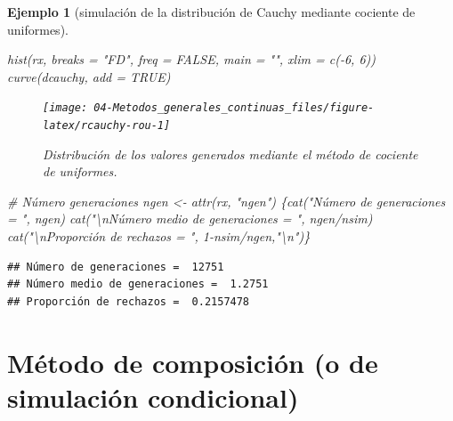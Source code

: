 \documentclass[
]{book}
\newenvironment{Shaded}{\begin{snugshade}}{\end{snugshade}}
\newcommand{\AttributeTok}[1]{\textcolor[rgb]{0.77,0.63,0.00}{#1}}
\newcommand{\CommentTok}[1]{\textcolor[rgb]{0.56,0.35,0.01}{\textit{#1}}}
\newcommand{\ConstantTok}[1]{\textcolor[rgb]{0.00,0.00,0.00}{#1}}
\newcommand{\DecValTok}[1]{\textcolor[rgb]{0.00,0.00,0.81}{#1}}
\newcommand{\FunctionTok}[1]{\textcolor[rgb]{0.00,0.00,0.00}{#1}}
\newcommand{\NormalTok}[1]{#1}
\newcommand{\OtherTok}[1]{\textcolor[rgb]{0.56,0.35,0.01}{#1}}
\newcommand{\SpecialCharTok}[1]{\textcolor[rgb]{0.00,0.00,0.00}{#1}}
\newcommand{\StringTok}[1]{\textcolor[rgb]{0.31,0.60,0.02}{#1}}
\theoremstyle{break}
\newtheorem{example}{Ejemplo}[chapter]
\theoremstyle{nonumberplain}
\begin{document}
\begin{example}[simulación de la distribución de Cauchy mediante cociente de uniformes]
\begin{Shaded}
\begin{Highlighting}[]
\FunctionTok{hist}\NormalTok{(rx, }\AttributeTok{breaks =} \StringTok{"FD"}\NormalTok{, }\AttributeTok{freq =} \ConstantTok{FALSE}\NormalTok{, }\AttributeTok{main =} \StringTok{""}\NormalTok{, }\AttributeTok{xlim =} \FunctionTok{c}\NormalTok{(}\SpecialCharTok{{-}}\DecValTok{6}\NormalTok{, }\DecValTok{6}\NormalTok{))}
\FunctionTok{curve}\NormalTok{(dcauchy, }\AttributeTok{add =} \ConstantTok{TRUE}\NormalTok{)}
\end{Highlighting}
\end{Shaded}

\begin{figure}[!htb]

{\centering \texttt{[image: 04-Metodos\_generales\_continuas\_files/figure-latex/rcauchy-rou-1]} 

}

\caption{Distribución de los valores generados mediante el método de cociente de uniformes.}\label{fig:rcauchy-rou}
\end{figure}

\begin{Shaded}
\begin{Highlighting}[]
\CommentTok{\# Número generaciones}
\NormalTok{ngen }\OtherTok{\textless{}{-}} \FunctionTok{attr}\NormalTok{(rx, }\StringTok{"ngen"}\NormalTok{)}
\NormalTok{\{}\FunctionTok{cat}\NormalTok{(}\StringTok{"Número de generaciones = "}\NormalTok{, ngen)}
\FunctionTok{cat}\NormalTok{(}\StringTok{"}\SpecialCharTok{\textbackslash{}n}\StringTok{Número medio de generaciones = "}\NormalTok{, ngen}\SpecialCharTok{/}\NormalTok{nsim)}
\FunctionTok{cat}\NormalTok{(}\StringTok{"}\SpecialCharTok{\textbackslash{}n}\StringTok{Proporción de rechazos = "}\NormalTok{, }\DecValTok{1}\SpecialCharTok{{-}}\NormalTok{nsim}\SpecialCharTok{/}\NormalTok{ngen,}\StringTok{"}\SpecialCharTok{\textbackslash{}n}\StringTok{"}\NormalTok{)\}}
\end{Highlighting}
\end{Shaded}

\begin{verbatim}
## Número de generaciones =  12751
## Número medio de generaciones =  1.2751
## Proporción de rechazos =  0.2157478
\end{verbatim}

\end{example}

\hypertarget{composicion}{%
\section{Método de composición (o de simulación condicional)}\label{composicion}}
\end{document}
